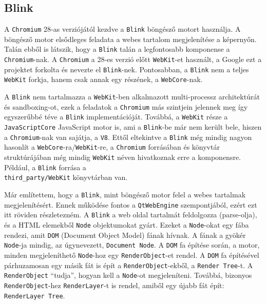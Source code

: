 \documentclass[12pt]{report}
\begin{document}
\subsection{Blink}
A \texttt{Chromium} 28-as verziójától kezdve a \texttt{Blink} böngésző motort használja.
A böngésző motor elsődleges feladata a webes tartalom megjelenítése a képernyőn. Talán
ebből is látszik, hogy a \texttt{Blink} talán a legfontosabb komponense
a \texttt{Chromium}-nak. A \texttt{Chromium} a 28-es verzió előtt \texttt{WebKit}-et
használt, a Google ezt a projektet forkolta és nevezte el \texttt{Blink}-nek. Pontosabban,
a \texttt{Blink} nem a teljes \texttt{WebKit} forkja, hanem csak annak egy részének, a
\texttt{WebCore}-nak.
\cite{bib-wiki-blink}

A \texttt{Blink} nem tartalmazza a \texttt{WebKit}-ben alkalmazott multi-processz
architektúrát és sandboxing-ot, ezek a feladatok a \texttt{Chromium} más szintjein jelennek
meg így egyszerűbbé téve a \texttt{Blink} implementációját. Továbbá, a \texttt{WebKit} része
a \texttt{JavaScriptCore} JavaScript motor is, ami a \texttt{Blink}-be már nem került bele,
hiszen a \texttt{Chromium}-nak van sajátja, a \texttt{V8}.
Ettől eltekintve a \texttt{Blink} még mindig nagyon hasonlít a
\texttt{WebCore}-ra/\texttt{WebKit}-re, a \texttt{Chromium}
forrásában és könyvtár struktúrájában még mindig \texttt{WebKit} néven hivatkoznak erre a
komponensre. Például, a \texttt{Blink} forrása a \\
\texttt{third\_party/WebKit} könyvtárban van.
\cite{bib-chromium-displays-web-pages, bib-chromium-blink}

Már említettem, hogy a \texttt{Blink}, mint böngésző motor felel a webes tartalmak
megjelenítésért. Ennek működése fontos a \texttt{QtWebEngine} szempontjából, ezért ezt itt
röviden részletezném.
A \texttt{Blink} a web oldal tartalmát feldolgozza (parse-olja), és a HTML elemekből
\texttt{Node} objektumokat gyárt. Ezeket a \texttt{Node}-okat egy fába rendezi, amit
\texttt{DOM} (Document Object Model) fának hívnak. A fának a gyökér \texttt{Node}-ja mindig,
az úgynevezett, \texttt{Document Node}. A \texttt{DOM} fa építése során, a motor, minden
megjeleníthető \texttt{Node}-hoz egy \texttt{RenderObject}-et rendel. A \texttt{DOM} fa
építésével párhuzamosan egy másik fát is épít a \texttt{RenderObject}-ekből, a
\texttt{Render Tree}-t. A \texttt{RenderObject} ``tudja'', hogyan kell a \texttt{Node}-ot
megjeleníteni. Továbbá, bizonyos \texttt{RenderObject}-hez \texttt{RenderLayer}-t is
rendel, amiből egy újabb fát épít: \texttt{RenderLayer Tree}.
\end{document}
